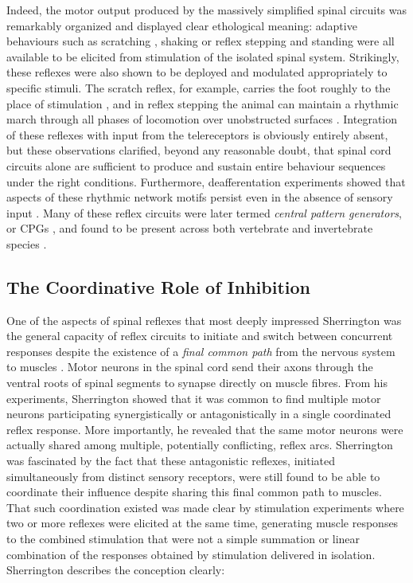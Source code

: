 Indeed, the motor output produced by the massively simplified spinal circuits was remarkably organized and displayed clear ethological meaning: adaptive behaviours such as scratching \cite{Sherrington1903}, shaking \cite{Goltz1896, Sherrington1903} or reflex stepping and standing \cite{Sherrington1910, Sherrington1915} were all available to be elicited from stimulation of the isolated spinal system. Strikingly, these reflexes were also shown to be deployed and modulated appropriately to specific stimuli. The scratch reflex, for example, carries the foot roughly to the place of stimulation \cite{Sherrington1904}, and in reflex stepping the animal can maintain a rhythmic march through all phases of locomotion over unobstructed surfaces \cite{Sherrington1910}. Integration of these reflexes with input from the telereceptors is obviously entirely absent, but these observations clarified, beyond any reasonable doubt, that spinal cord circuits alone are sufficient to produce and sustain entire behaviour sequences under the right conditions. Furthermore, deafferentation experiments showed that aspects of these rhythmic network motifs persist even in the absence of sensory input \cite{GrahamBrown1911}. Many of these reflex circuits were later termed \emph{central pattern generators}, or CPGs \cite{Grillner1975, Grillner1981}, and found to be present across both vertebrate and invertebrate species \cite{Orlovsky1999,Selverston2010}.

\subsection{The Coordinative Role of Inhibition}

One of the aspects of spinal reflexes that most deeply impressed Sherrington was the general capacity of reflex circuits to initiate and switch between concurrent responses despite the existence of a \emph{final common path} from the nervous system to muscles \cite{Sherrington1904}. Motor neurons in the spinal cord send their axons through the ventral roots of spinal segments to synapse directly on muscle fibres. From his experiments, Sherrington showed that it was common to find multiple motor neurons participating synergistically or antagonistically in a single coordinated reflex response. More importantly, he revealed that the same motor neurons were actually shared among multiple, potentially conflicting, reflex arcs. Sherrington was fascinated by the fact that these antagonistic reflexes, initiated simultaneously from distinct sensory receptors, were still found to be able to coordinate their influence despite sharing this final common path to muscles. That such coordination existed was made clear by stimulation experiments where two or more reflexes were elicited at the same time, generating muscle responses to the combined stimulation that were not a simple summation or linear combination of the responses obtained by stimulation delivered in isolation. Sherrington describes the conception clearly:

